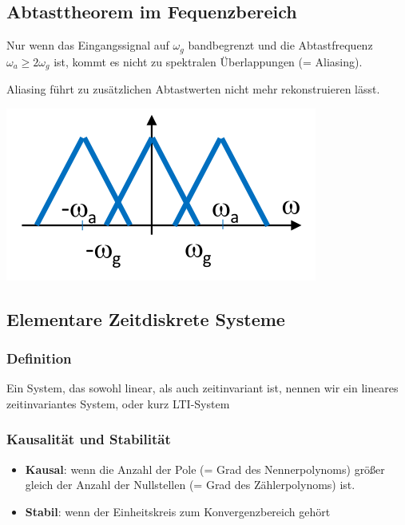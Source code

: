 \subsection{Abtasttheorem im Fequenzbereich}
Nur wenn das Eingangssignal auf $\omega_g$ bandbegrenzt und die Abtastfrequenz $\omega_a  \geq
	2\omega_g$ ist, kommt es nicht zu spektralen Überlappungen (= Aliasing).

Aliasing führt zu zusätzlichen Abtastwerten nicht mehr rekonstruieren lässt.

\centering
\includegraphics[width=0.5\columnwidth]{Bilder/Abtasttheorem_Uebrlappung}

\raggedright
\subsection{Elementare Zeitdiskrete Systeme}
\subsubsection{Definition}
Ein System, das sowohl linear, als auch zeitinvariant ist, nennen wir ein
lineares zeitinvariantes System, oder kurz LTI-System

\subsubsection{Kausalität und Stabilität}
\begin{itemize}
	\item \textbf{Kausal}:
	      wenn die Anzahl der Pole (= Grad des Nennerpolynoms) größer gleich
	      der Anzahl der Nullstellen (= Grad des Zählerpolynoms) ist.
	\item \textbf{Stabil}:
	      wenn der Einheitskreis zum Konvergenzbereich gehört
\end{itemize}

\begin{center}
\end{center}

